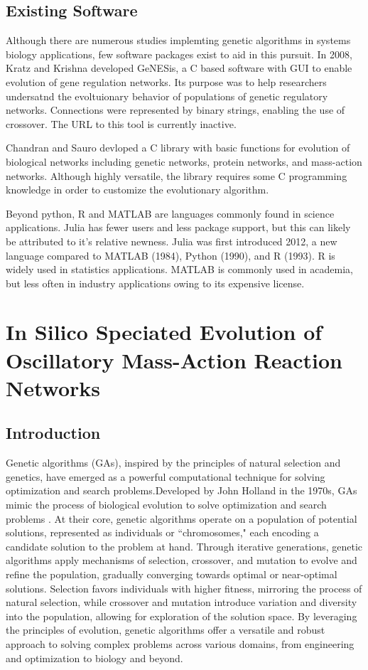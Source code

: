 \documentclass[12pt]{report}
\begin{document}
\section{Existing Software}

Although there are numerous studies implemting genetic algorithms in systems biology applications, few software packages exist to aid in this pursuit. In 2008, Kratz and Krishna developed GeNESis, a C based software with GUI to enable evolution of gene regulation networks. Its purpose was to help researchers undersatnd the evoltuionary behavior of populations of genetic regulatory networks. Connections were represented by binary strings, enabling the use of crossover. The URL to this tool is currently inactive.

Chandran and Sauro devloped a C library with basic functions for evolution of biological networks including genetic networks, protein networks, and mass-action networks. Although highly versatile, the library requires some C programming knowledge in order to customize the evolutionary algorithm.

Beyond python, R and MATLAB are languages commonly found in science applications. Julia has fewer users and less package support, but this can likely be attributed to it's relative newness. Julia was first introduced 2012, a new language compared to MATLAB (1984), Python (1990), and R (1993). R is widely used in statistics applications. MATLAB is commonly used in academia, but less often in industry applications owing to its expensive license.

\chapter{In Silico Speciated Evolution of Oscillatory Mass-Action Reaction Networks}
\label{chap: NetEvolve}
\section{Introduction}
Genetic algorithms (GAs), inspired by the principles of natural selection and genetics, have emerged as a powerful computational technique for solving optimization and search problems.Developed by John Holland in the 1970s, GAs mimic the process of biological evolution to solve optimization and search problems \cite{holland_1975}. At their core, genetic algorithms operate on a population of potential solutions, represented as individuals or ``chromosomes," each encoding a candidate solution to the problem at hand. Through iterative generations, genetic algorithms apply mechanisms of selection, crossover, and mutation to evolve and refine the population, gradually converging towards optimal or near-optimal solutions. Selection favors individuals with higher fitness, mirroring the process of natural selection, while crossover and mutation introduce variation and diversity into the population, allowing for exploration of the solution space. By leveraging the principles of evolution, genetic algorithms offer a versatile and robust approach to solving complex problems across various domains, from engineering and optimization to biology and beyond.
\end{document}
